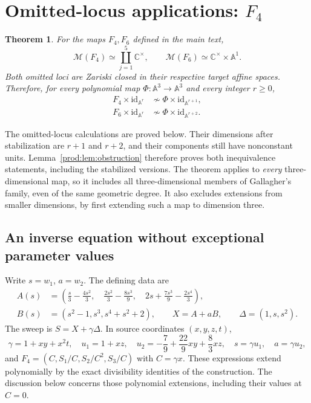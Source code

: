 \documentclass[11pt]{article}
\numberwithin{equation}{section}
\theoremstyle{plain}
\newtheorem{theorem}{Theorem}[section]
\theoremstyle{definition}
\theoremstyle{remark}
\newcommand{\C}{\mathbb{C}}
\newcommand{\A}{\mathbb{A}}
\newcommand{\id}{\mathrm{id}}
\newcommand{\Miss}{\mathcal M}
\begin{document}
\section{Omitted-locus applications: \texorpdfstring{$F_4$}{F4}}\label{prod:sec:F4-omitted}
\begin{theorem}\label{prod:thm:main}
For the maps $F_4,F_6$ defined in the main text,
\[
 \Miss(F_4)\simeq\coprod_{j=1}^{5}\C^\times,
 \qquad
 \Miss(F_6)\simeq\C^\times\times\A^1.
\]
Both omitted loci are Zariski closed in their respective target affine spaces. Therefore, for every polynomial map
$\Phi:\A^3\to\A^3$ and every integer $r\geq0$,
\begin{align*}
 F_4\times\id_{\A^r}&\nsim\Phi\times\id_{\A^{r+1}},\\
 F_6\times\id_{\A^r}&\nsim\Phi\times\id_{\A^{r+2}}.
\end{align*}
\end{theorem}
The omitted-locus calculations are proved below. Their dimensions after
stabilization are $r+1$ and $r+2$, and their components still have
nonconstant units. Lemma~\ref{prod:lem:obstruction} therefore proves both
inequivalence statements, including the stabilized versions. The theorem
applies to \emph{every} three-dimensional map, so it includes all
three-dimensional members of Gallagher's family, even of the same
geometric degree. It also excludes extensions from smaller dimensions,
by first extending such a map to dimension three.


\subsection{An inverse equation without exceptional parameter values}
Write $s=w_1$, $a=w_2$. The defining data are
\begin{align*}
 A(s)&=\left(\frac{s}{3}-\frac{4s^2}{3},\quad
 \frac{2s^2}{3}-\frac{8s^3}{9},\quad
 2s+\frac{7s^3}{9}-\frac{2s^4}{3}\right),\\
 B(s)&=(s^2-1,s^3,s^4+s^2+2),\qquad
 X=A+aB,\qquad \Delta=(1,s,s^2).
\end{align*}
The sweep is $S=X+\gamma\Delta$. In source coordinates $(x,y,z,t)$,
\[
 \gamma=1+xy+x^2t,\quad u_1=1+xz,\quad
 u_2=-\frac79+\frac{22}{9}xy+\frac83xz,
 \quad s=\gamma u_1,\quad a=\gamma u_2,
\]
and $F_4=(C,S_1/C,S_2/C^2,S_3/C)$ with $C=\gamma x$.
These expressions extend polynomially by the exact divisibility
identities of the construction. The discussion below concerns those
polynomial extensions, including their values at $C=0$.
\end{document}
